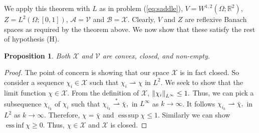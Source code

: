\documentclass[11pt]{article}
\newtheorem{proposition}[theorem]{Proposition}
\DeclareMathOperator*{\esssup}{ess\,sup}
\DeclareMathOperator*{\essinf}{ess\,inf}
\begin{document}
We apply this theorem with $L$ as in problem (\ref{eq:saddle}), $V = W^{1,2}(\Omega; \mathbb{R}^2)$, $Z=L^2(\Omega;[0,1])$, ${\mathcal A} = {\mathcal V}$ and $\mathcal{B} = \mathcal{X}$.  Clearly, $V$ and $Z$ are reflexive Banach spaces as required by the theorem above.  We now show that these satisfy the rest of hypothesis (H).

\begin{proposition}
\label{spaceproperties}
Both $\mathcal{X}$ and $\mathcal{V}$ are convex, closed, and non-empty.
\end{proposition}
\begin{proof}
The point of concern is showing that our space $\mathcal{X}$ is in fact closed. So consider a sequence $\chi_i\in \mathcal{X}$ such that 
$
\chi_i {\rightharpoonup} \chi
$
in $L^2$.
We seek to show that the limit function $\chi\in \mathcal{X}$. From the definition of $\mathcal{X}$, 
$\norm{\chi_i}_{L^\infty}\leq1.$ Thus, we can pick a subsequence $\chi_{i_k}$ of $\chi_i$ such that
$
\chi_{i_k}\overset{\ast}{\rightharpoonup}\bar{\chi},
$
in $L^\infty$ as $k\to \infty$.  It follows
$
\chi_{i_k}{\rightharpoonup}\bar{\chi},
$
in $L^2$ as $k\to \infty$.  Therefore, $\chi = \bar{\chi}$ and $\esssup \chi \le 1$.  Similarly we can show
$\essinf \chi \ge 0$.  Thus, $\chi \in {\mathcal X}$ and $\mathcal{X}$ is closed. 
\end{proof}
\end{document}
